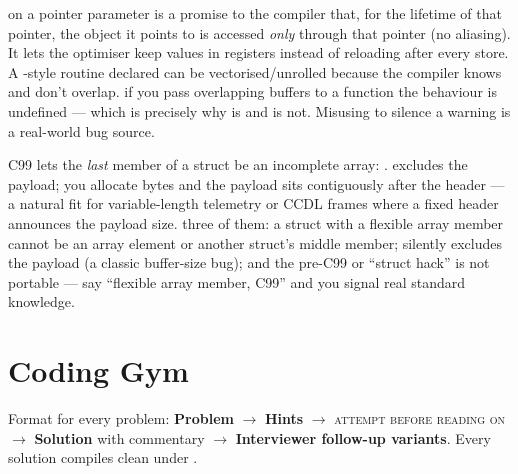  on a pointer parameter is a promise to the compiler that, for
the lifetime of that pointer, the object it points to is accessed \emph{only}
through that pointer (no aliasing). It lets the optimiser keep values in
registers instead of reloading after every store. A -style
routine declared
can be vectorised/unrolled because the compiler knows  and
 don't overlap. \trap if you pass overlapping buffers to a
 function the behaviour is undefined --- which is precisely
why  is  and  is not. Misusing
 to silence a warning is a real-world bug source.

C99 lets the \emph{last} member of a struct be an incomplete array:
.
 excludes the payload; you allocate
 bytes and the payload sits contiguously after
the header --- a natural fit for variable-length telemetry or CCDL frames
where a fixed header announces the payload size. \trap three of them: a
struct with a flexible array member cannot be an array element or another
struct's middle member;  silently excludes the payload (a
classic buffer-size bug); and the pre-C99  or
 ``struct hack'' is not portable --- say ``flexible array
member, C99'' and you signal real standard knowledge.

\section{Coding Gym}

\begin{partnote}
Format for every problem: \textbf{Problem} $\rightarrow$ \textbf{Hints}
$\rightarrow$ \textsc{attempt before reading on} $\rightarrow$
\textbf{Solution} with commentary $\rightarrow$ \textbf{Interviewer follow-up
variants}. Every solution compiles clean under
.
\end{partnote}

